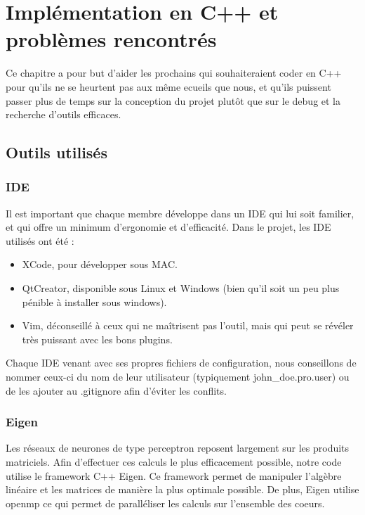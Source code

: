 \chapter{Implémentation en C++ et problèmes rencontrés}

Ce chapitre a pour but d'aider les prochains qui souhaiteraient coder en C++ pour qu'ils ne se heurtent pas aux même ecueils que nous, et qu'ils puissent passer plus de temps sur la conception du projet plutôt que sur le debug et la recherche d'outils efficaces.

\section{Outils utilisés}

\subsection{IDE}

Il est important que chaque membre développe dans un IDE qui lui soit familier, et qui offre un minimum d'ergonomie et d'efficacité. Dans le projet, les IDE utilisés ont été :
\begin{itemize}
    \item XCode, pour développer sous MAC. 
    \item QtCreator, disponible sous Linux et Windows (bien qu'il soit un peu plus pénible à installer sous windows).
    \item Vim, déconseillé à ceux qui ne maîtrisent pas l'outil, mais qui peut se révéler très puissant avec les bons plugins.
\end{itemize}

Chaque IDE venant avec ses propres fichiers de configuration, nous conseillons de nommer ceux-ci du nom de leur utilisateur (typiquement john\_doe.pro.user) ou de les ajouter au .gitignore afin d'éviter les conflits.

\subsection{Eigen}

Les réseaux de neurones de type perceptron reposent largement sur les produits matriciels. Afin d'effectuer ces calculs le plus efficacement possible, notre code utilise le framework C++ Eigen. Ce framework permet de manipuler l'algèbre linéaire et les matrices de manière la plus optimale possible. De plus, Eigen utilise openmp ce qui permet de paralléliser les calculs sur l'ensemble des coeurs. 

